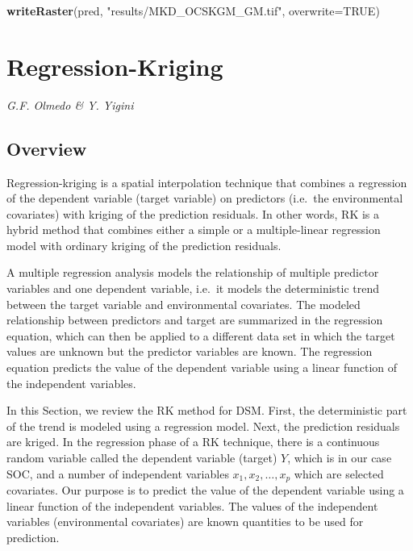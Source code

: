 \documentclass[10pt,b5paper,]{book}
\newenvironment{Shaded}{\begin{snugshade}}{\end{snugshade}}
\newcommand{\DataTypeTok}[1]{\textcolor[rgb]{0.13,0.29,0.53}{#1}}
\newcommand{\KeywordTok}[1]{\textcolor[rgb]{0.13,0.29,0.53}{\textbf{#1}}}
\newcommand{\NormalTok}[1]{#1}
\newcommand{\OtherTok}[1]{\textcolor[rgb]{0.56,0.35,0.01}{#1}}
\newcommand{\StringTok}[1]{\textcolor[rgb]{0.31,0.60,0.02}{#1}}
\theoremstyle{definition}
\theoremstyle{definition}
\theoremstyle{definition}
\theoremstyle{remark}
\begin{document}
\begin{Shaded}
\begin{Highlighting}[]
\KeywordTok{writeRaster}\NormalTok{(pred, }\StringTok{"results/MKD_OCSKGM_GM.tif"}\NormalTok{,}
            \DataTypeTok{overwrite=}\OtherTok{TRUE}\NormalTok{)}
\end{Highlighting}
\end{Shaded}

\clearpage

\hypertarget{RK}{%
\section{Regression-Kriging}\label{RK}}

\emph{G.F. Olmedo \& Y. Yigini}

\hypertarget{overview-1}{%
\subsection{Overview}\label{overview-1}}

Regression-kriging is a spatial interpolation technique that combines a
regression of the dependent variable (target variable) on predictors
(i.e.~the environmental covariates) with kriging of the prediction
residuals. In other words, RK is a hybrid method that combines either a
simple or a multiple-linear regression model with ordinary kriging of
the prediction residuals.

A multiple regression analysis models the relationship of multiple
predictor variables and one dependent variable, i.e.~it models the
deterministic trend between the target variable and environmental
covariates. The modeled relationship between predictors and target are
summarized in the regression equation, which can then be applied to a
different data set in which the target values are unknown but the
predictor variables are known. The regression equation predicts the
value of the dependent variable using a linear function of the
independent variables.

In this Section, we review the RK method for DSM. First, the
deterministic part of the trend is modeled using a regression model.
Next, the prediction residuals are kriged. In the regression phase of a
RK technique, there is a continuous random variable called the dependent
variable (target) \(Y\), which is in our case SOC, and a number of
independent variables \({x_1, x_2,\dots,x_p}\) which are selected
covariates. Our purpose is to predict the value of the dependent
variable using a linear function of the independent variables. The
values of the independent variables (environmental covariates) are known
quantities to be used for prediction.
\end{document}
